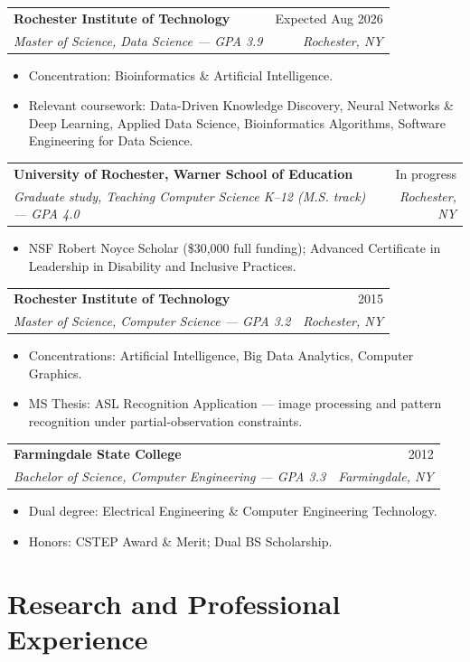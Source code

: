 \documentclass[11pt]{article}
\makeatletter
\newcommand{\entry}[4]{
  \noindent\begin{tabularx}{\textwidth}{@{}Xr@{}}
    \textbf{#1} & #2 \\
    \textit{#3} & \textit{#4}
  \end{tabularx}\vspace{2pt}
}
\makeatother
\begin{document}
\entry{Rochester Institute of Technology}{Expected Aug 2026}{Master of Science, Data Science --- GPA 3.9}{Rochester, NY}
\begin{itemize}
  \item Concentration: Bioinformatics \& Artificial Intelligence.
  \item Relevant coursework: Data-Driven Knowledge Discovery, Neural Networks \& Deep Learning, Applied Data Science, Bioinformatics Algorithms, Software Engineering for Data Science.
\end{itemize}

\entry{University of Rochester, Warner School of Education}{In progress}{Graduate study, Teaching Computer Science K--12 (M.S. track) --- GPA 4.0}{Rochester, NY}
\begin{itemize}
  \item NSF Robert Noyce Scholar (\$30,000 full funding); Advanced Certificate in Leadership in Disability and Inclusive Practices.
\end{itemize}

\entry{Rochester Institute of Technology}{2015}{Master of Science, Computer Science --- GPA 3.2}{Rochester, NY}
\begin{itemize}
  \item Concentrations: Artificial Intelligence, Big Data Analytics, Computer Graphics.
  \item MS Thesis: ASL Recognition Application --- image processing and pattern recognition under partial-observation constraints.
\end{itemize}

\entry{Farmingdale State College}{2012}{Bachelor of Science, Computer Engineering --- GPA 3.3}{Farmingdale, NY}
\begin{itemize}
  \item Dual degree: Electrical Engineering \& Computer Engineering Technology.
  \item Honors: CSTEP Award \& Merit; Dual BS Scholarship.
\end{itemize}

\section{Research and Professional Experience}
\end{document}
